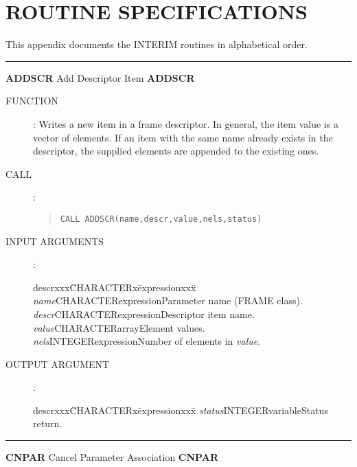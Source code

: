 \documentclass{article}
\begin{document}
\section {ROUTINE SPECIFICATIONS}
This appendix documents the INTERIM routines in alphabetical order.\\
\vspace{5mm}
\rule{\textwidth}{0.3mm}
{\Large {\bf ADDSCR} \hfill Add Descriptor Item \hfill {\bf ADDSCR}}
\begin{description}
\item [FUNCTION]:
Writes a new item in a frame descriptor.
In general, the item value is a vector of elements.
If  an item with the same name already exists in the descriptor, the supplied
elements are appended to the existing ones.
\item [CALL]:
\begin{quote}
{\tt CALL ADDSCR(name,descr,value,nels,status)}
\end{quote}
\item [INPUT ARGUMENTS]:
\begin{tabbing}
descrxxx\=CHARACTERx\=expressionxxx\=\kill
{\em name}\>CHARACTER\>expression\>Parameter name (FRAME class).\\
{\em descr}\>CHARACTER\>expression\>Descriptor item name.\\
{\em value}\>CHARACTER\>array\>Element values.\\
{\em nels}\>INTEGER\>expression\>Number of elements in {\em value}.
\end{tabbing}
\item [OUTPUT ARGUMENT]:
\begin{tabbing}
descrxxx\=CHARACTERx\=expressionxxx\=\kill
{\em status}\>INTEGER\>variable\>Status return.
\end{tabbing}
\end{description}
\rule{\textwidth}{0.3mm}
{\Large {\bf CNPAR} \hfill Cancel Parameter Association \hfill {\bf CNPAR}}
\end{document}
